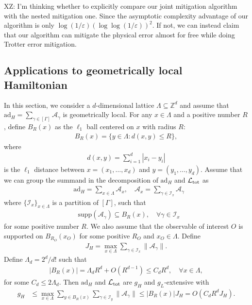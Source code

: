 \documentclass[aps,pra,reprint,groupedaddress,floatfix]{revtex4-2}
\renewcommand{\L}{\mathcal{L}}
\newcommand{\ad}{\mathrm{ad}}
\newcommand{\A}{\mathcal{A}}
\newcommand{\supp}{\mathrm{supp}}
\newcommand{\eps}{\varepsilon}
\newcommand{\mc}{\mathcal}
\newcommand{\xz}[1]{{\color{cyan} XZ: #1}}
\begin{document}
\xz{I'm thinking whether to explicitly compare our joint mitigation algorithm with the nested mitigation one. Since the asymptotic complexity advantage of our algorithm is only $\log(1/\eps)(\log\log(1/\eps))^2$. If not, we can instead claim that our algorithm can mitigate the physical error almost for free while doing Trotter error mitigation. }


\subsection{Applications to geometrically local Hamiltonian}
\label{sec:geo-local}
In this section, we consider a $d$-dimensional lattice $\Lambda \subseteq \mathbb{Z}^d$ and assume that $\ad_H = \sum_{\gamma\in [\Gamma]} \A_{\gamma}$ is geometrically local. 
For any $x\in \Lambda$ and a positive number $R$, define $B_R(x)$ as the $\ell_1$ ball centered on $x$ with radius $R$: \begin{align*}
    B_R(x) = \{ y\in \Lambda:d(x,y) \le R\},
\end{align*}
where \begin{align*}
    d(x,y) = \sum_{i=1}^d  |x_i-y_i|
\end{align*}
is the $\ell_1$ distance between $x = (x_1, \ldots, x_d)$ and $y= (y_1, \ldots, y_d)$. 
Assume that we can group the summand in the decomposition of $\ad_H$ and $\L_{\rm tot}$ as \begin{align*}
    &\ad_H = \sum_{x\in {\Lambda}} \A_x, \quad \A_x = \sum_{\gamma\in \mc I_x} \A_{\gamma} 
\end{align*} where $\{\mc I_x\}_{x\in \Lambda}$ is a partition of $[\Gamma]$, such that \begin{align*}
    &\supp(\A_{\gamma}) \subseteq B_R(x), \quad \forall \gamma\in \mc I_x
\end{align*} for some positive number $R$. We also assume that the observable of interest $O$ is supported on $B_{R_O}(x_O)$ for some positive $R_O$ and $x_O\in \Lambda$. Define \begin{align*}
    J_H = \max_{x\in \Lambda}\sum_{\gamma\in \mc I_x} \|\A_{\gamma}\|.
\end{align*} Define $\Lambda_d = 2^d/d!$ such that \begin{align*}
    |B_R(x)| = \Lambda_dR^d + O(R^{d-1})\le C_d R^d, \quad \forall x\in \Lambda,
\end{align*}
for some $C_d\le 2\Lambda_d$.
Then $\ad_H$ and $\L_{\rm tot}$ are $g_H$ and $g_L$-extensive with \begin{align*}
    g_H &\le \max_{x\in \Lambda} \sum_{y\in B_R(x)}\sum_{\gamma\in \mc I_y} \|\A_{\gamma}\|\le |B_R(x)|J_H  = O(C_d R^d J_H).
\end{align*}
\end{document}
